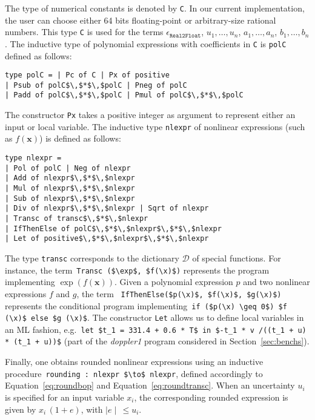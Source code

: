 \documentclass[preprint,fleqn,nocopyrightspace]{sigplanconf}
\newcommand{\code}[1]{\lstinline{#1}}
\newcommand{\setD}{\mathcal{D}} %
\newcommand{\x}{\mathbf{x}}
\newcommand{\realtofloat}{\mathtt{Real2Float}}
\theoremstyle{plain}
\begin{document}
The type of numerical constants is denoted by \code{C}. In our current implementation, the user can choose either 64 bits floating-point or arbitrary-size rational numbers. This type \code{C} is used for the terms $\epsilon_{\realtofloat}$, $u_1, \dots, u_n$, $a_1, \dots, a_n$, $b_1, \dots, b_n$.
%
The inductive type of polynomial expressions with coefficients in \code{C} is \code{polC} defined as follows:
\begin{lstlisting}
type polC = | Pc of C | Px of positive 
| Psub of polC$\,$*$\,$polC | Pneg of polC 
| Padd of polC$\,$*$\,$polC | Pmul of polC$\,$*$\,$polC
\end{lstlisting}
%
The constructor \code{Px} takes a positive integer as argument to represent either an input or local variable.
The inductive type \code{nlexpr} of nonlinear expressions (such as $f(\x)$) is defined as follows:
\begin{lstlisting}
type nlexpr = 
| Pol of polC | Neg of nlexpr
| Add of nlexpr$\,$*$\,$nlexpr 
| Mul of nlexpr$\,$*$\,$nlexpr 
| Sub of nlexpr$\,$*$\,$nlexpr 
| Div of nlexpr$\,$*$\,$nlexpr | Sqrt of nlexpr 
| Transc of transc$\,$*$\,$nlexpr
| IfThenElse of polC$\,$*$\,$nlexpr$\,$*$\,$nlexpr
| Let of positive$\,$*$\,$nlexpr$\,$*$\,$nlexpr
\end{lstlisting}
%
The type \code{transc} corresponds to the dictionary $\setD$ of special functions. For instance, the term~\lstinline|Transc ($\exp$, $f(\x)$)| represents the program implementing $\exp(f(\x))$.
Given a polynomial expression $p$ and two nonlinear expressions $f$ and $g$, the term ~\lstinline|IfThenElse($p(\x)$, $f(\x)$, $g(\x)$)| represents the conditional program implementing~\lstinline|if ($p(\x) \geq 0$) $f (\x)$ else $g (\x)$|. The constructor \code{Let} allows us to define local variables in an ML fashion, e.g.~\lstinline|let $t_1 = 331.4 + 0.6 * T$ in $-t_1 * v /((t_1 + u) * (t_1 + u))$| (part of the \textit{doppler1} program considered in Section~\ref{sec:benchs}).
%
%

Finally, one obtains rounded nonlinear expressions using an inductive procedure~\lstinline|rounding : nlexpr $\to$ nlexpr|, defined accordingly to Equation~\eqref{eq:roundbop} and Equation~\eqref{eq:roundtransc}. When an uncertainty $u_i$ is specified for an input variable $x_i$, the corresponding rounded expression is given by $x_i \, (1 + e)$, with $\mid e \mid \, \leq u_i$.
\end{document}
